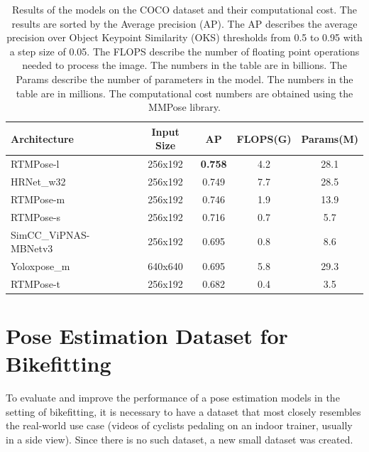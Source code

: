 
\begin{table}[htbp]

    \centering
    \begin{tabular}{lcccc}
        \toprule
        Architecture          & Input Size & AP             & FLOPS(G) & Params(M) \\
        \midrule
        RTMPose-l             & 256x192    & \textbf{0.758} & 4.2      & 28.1      \\
        HRNet\_w32            & 256x192    & 0.749          & 7.7      & 28.5      \\
        RTMPose-m             & 256x192    & 0.746          & 1.9      & 13.9      \\
        RTMPose-s             & 256x192    & 0.716          & 0.7      & 5.7       \\
        SimCC\_ViPNAS-MBNetv3 & 256x192    & 0.695          & 0.8      & 8.6       \\
        Yoloxpose\_m          & 640x640    & 0.695          & 5.8      & 29.3      \\
        RTMPose-t             & 256x192    & 0.682          & 0.4      & 3.5       \\


        \bottomrule
    \end{tabular}
    \caption{Results of the models on the COCO dataset and their computational cost. The results are sorted by the Average precision (AP). The AP describes the average precision over Object Keypoint Similarity (OKS) thresholds from 0.5 to 0.95 with a step size of 0.05. The FLOPS describe the number of floating point operations needed to process the image. The numbers in the table are in billions. The Params describe the number of parameters in the model. The numbers in the table are in millions. The computational cost numbers are obtained using the MMPose library.}
    \label{tab:evaluation_params}

\end{table}


\chapter{Pose Estimation Dataset for Bikefitting}
\label{ch:dataset}
To evaluate and improve the performance of a pose estimation models in the setting of bikefitting, it is necessary to have a dataset that most closely resembles the real-world use case (videos of cyclists pedaling on an indoor trainer, usually in a side view). Since there is no such dataset, a new small dataset was created.

